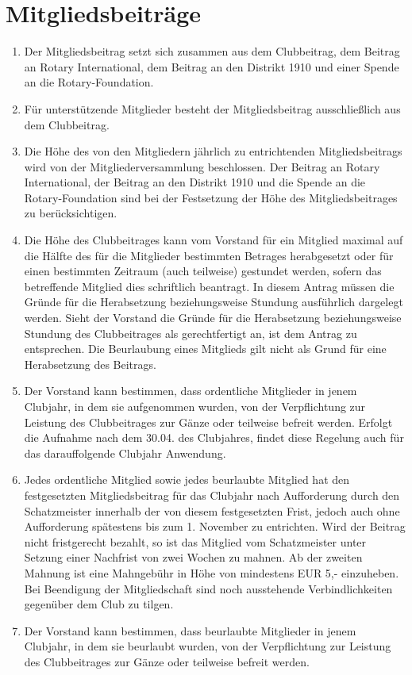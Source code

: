 \documentclass{statutclass}
\begin{document}
\section{Mitgliedsbeiträge}
\begin{enumerate}
    \item Der Mitgliedsbeitrag setzt sich zusammen aus dem Clubbeitrag, dem Beitrag an Rotary International, dem Beitrag an den Distrikt 1910 und einer Spende an die Rotary-Foundation.
    \item Für unterstützende Mitglieder besteht der Mitgliedsbeitrag ausschließlich aus dem Clubbeitrag.
    \item Die Höhe des von den Mitgliedern jährlich zu entrichtenden Mitgliedsbeitrags wird von der Mitgliederversammlung beschlossen. Der Beitrag an Rotary International, der Beitrag an den Distrikt 1910 und die Spende an die Rotary-Foundation sind bei der Festsetzung der Höhe des Mitgliedsbeitrages zu berücksichtigen.
    \item Die Höhe des Clubbeitrages kann vom Vorstand für ein Mitglied maximal auf die Hälfte des für die Mitglieder bestimmten Betrages herabgesetzt oder für einen bestimmten Zeitraum (auch teilweise) gestundet werden, sofern das betreffende Mitglied dies schriftlich beantragt. In diesem Antrag müssen die Gründe für die Herabsetzung beziehungsweise Stundung ausführlich dargelegt werden. Sieht der Vorstand die Gründe für die Herabsetzung beziehungsweise Stundung des Clubbeitrages als gerechtfertigt an, ist dem Antrag zu entsprechen. Die Beurlaubung eines Mitglieds gilt nicht als Grund für eine Herabsetzung des Beitrags.
    \item Der Vorstand kann bestimmen, dass ordentliche Mitglieder in jenem Clubjahr, in dem sie aufgenommen wurden, von der Verpflichtung zur Leistung des Clubbeitrages zur Gänze oder teilweise befreit werden. Erfolgt die Aufnahme nach dem 30.04. des Clubjahres, findet diese Regelung auch für das darauffolgende Clubjahr Anwendung.
    \item Jedes ordentliche Mitglied sowie jedes beurlaubte Mitglied hat den festgesetzten Mitgliedsbeitrag für das Clubjahr nach Aufforderung durch den Schatzmeister innerhalb der von diesem festgesetzten Frist, jedoch auch ohne Aufforderung spätestens bis zum 1. November zu entrichten. Wird der Beitrag nicht fristgerecht bezahlt, so ist das Mitglied vom Schatzmeister unter Setzung einer Nachfrist von zwei Wochen zu mahnen. Ab der zweiten Mahnung ist eine Mahngebühr in Höhe von mindestens EUR 5,- einzuheben. Bei Beendigung der Mitgliedschaft sind noch ausstehende Verbindlichkeiten gegenüber dem Club zu tilgen.
    \item Der Vorstand kann bestimmen, dass beurlaubte Mitglieder in jenem Clubjahr, in dem sie beurlaubt wurden, von der Verpflichtung zur Leistung des Clubbeitrages zur Gänze oder teilweise befreit werden.
\end{enumerate}
\end{document}
